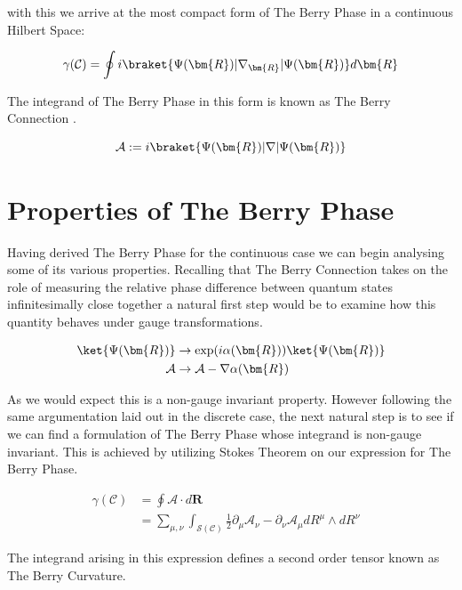 \documentclass{article}
\begin{document}
  with this we arrive at the most compact form of The Berry Phase in a continuous Hilbert Space:

  \begin{equation*}
    \gamma(\mathcal{C}) = \oint i \braket{\Psi(\bm{R})|\nabla_{\bm{R}}|\Psi(\bm{R})} d\bm{R}
  \end{equation*}

  The integrand of The Berry Phase in this form is known as The Berry Connection \cite{Asboth2016}. 
  
  \begin{equation*}
    \mathcal{A} := i \braket{\Psi(\bm{R})|\nabla|\Psi(\bm{R})}
  \end{equation*}

\section{Properties of The Berry Phase}

Having derived The Berry Phase for the continuous case we can begin analysing some of its various properties. Recalling that The Berry Connection takes on the role of measuring the relative phase difference between quantum states infinitesimally close together a natural first step would be to examine how this quantity behaves under gauge transformations.

  \begin{align*}
    \ket{\Psi(\bm{R})} &\rightarrow \exp(i \alpha(\bm{R})) \ket{\Psi(\bm{R})}\\
    \mathcal{A} &\rightarrow \mathcal{A} - \nabla \alpha(\bm{R})\\
  \end{align*}

  As we would expect this is a non-gauge invariant property. However following the same argumentation laid out in the discrete case, the next natural step is to see if we can find a formulation of The Berry Phase whose integrand is non-gauge invariant. This is achieved by utilizing Stokes Theorem on our expression for The Berry Phase.

  \begin{align*}
    \gamma(\mathcal{C}) &= \oint \mathcal{A} \cdot d\bm{R}\\
    & = \sum_{\mu, \nu} \int_{\mathcal{S}(\mathcal{C})} \frac{1}{2} \partial_{\mu} \mathcal{A}_{\nu} - \partial_{\nu} \mathcal{A}_{\mu} dR^{\mu} \wedge dR^{\nu}&
  \end{align*}


The integrand arising in this expression defines a second order tensor known as The Berry Curvature.
\end{document}
